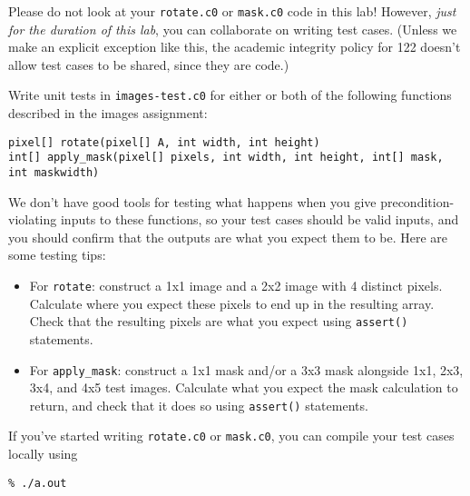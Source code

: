 Please do not look at your \lstinline'rotate.c0' or \lstinline'mask.c0' code
in this lab!  However, \emph{just for the duration of this lab}, you
can collaborate on writing test cases. (Unless we make an explicit
exception like this, the academic integrity policy for 122 doesn't
allow test cases to be shared, since they are code.)

\begin{part}
Write unit tests in \lstinline'images-test.c0' for either or both of the
following functions described in the images assignment:
\end{part}
\begin{lstlisting}
pixel[] rotate(pixel[] A, int width, int height)
int[] apply_mask(pixel[] pixels, int width, int height, int[] mask, int maskwidth)
\end{lstlisting}

We don't have good tools for testing what happens when you give
precondition-violating inputs to these functions, so your test cases
should be valid inputs, and you should confirm that the outputs are
what you expect them to be. Here are some testing tips:
\begin{itemize}
\item%
  For \lstinline'rotate': construct a 1x1 image and a 2x2 image with 4
  distinct pixels. Calculate where you expect these pixels to end up
  in the resulting array. Check that the resulting pixels are what you
  expect using \lstinline'assert()' statements.
\item%
  For \lstinline'apply_mask': construct a 1x1 mask and/or a 3x3 mask
  alongside 1x1, 2x3, 3x4, and 4x5 test images. Calculate what you
  expect the mask calculation to return, and check that it does so
  using \lstinline'assert()' statements.
\end{itemize}

If you've started writing \lstinline'rotate.c0' or \lstinline'mask.c0',
you can compile your test cases locally using

\begin{lstlisting}[language={[coin]C}]
% cc0 -d pixel.c0 imageutil.c0 rotate.c0 mask.c0 images-test.c0
% ./a.out
\end{lstlisting}
